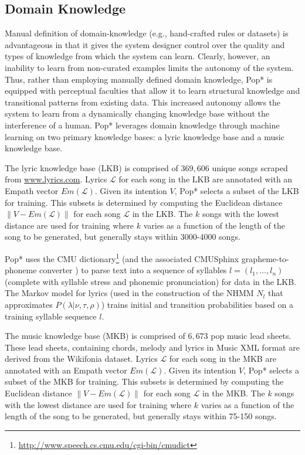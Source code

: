 \documentclass[phd,electronic,oneside,twosidetoc,letterpaper,chaptercenter,parttop,lof,lot]{byumsphd}
\begin{document}
\subsection{Domain Knowledge}

Manual definition of domain-knowledge (e.g., hand-crafted rules or datasets) is advantageous in that it gives the system designer control over the quality and types of knowledge from which the system can learn. Clearly, however, an inability to learn from non-curated examples limits the autonomy of the system. Thus, rather than employing manually defined domain knowledge, Pop* is equipped with perceptual faculties that allow it to learn structural knowledge and transitional patterns from existing data. This increased autonomy allows the system to learn from a dynamically changing knowledge base without the interference of a human. Pop* leverages domain knowledge through machine learning on two primary knowledge bases: a lyric knowledge base and a music knowledge base.

The lyric knowledge base (LKB) is comprised of $369,606$ unique songs scraped from \url{www.lyrics.com}. Lyrics $\mathcal{L}$ for each song in the LKB are annotated with an Empath vector $Em(\mathcal{L})$. Given its intention $V$, Pop* selects a subset of the LKB for training. This subsets is determined by computing the Euclidean distance $\lVert V - Em(\mathcal{L})\rVert$ for each song $\mathcal{L}$ in the LKB. The $k$ songs with the lowest distance are used for training where $k$ varies as a function of the length of the song to be generated, but generally stays within 3000-4000 songs.

Pop* uses the CMU dictionary\footnote{\url{http://www.speech.cs.cmu.edu/cgi-bin/cmudict}} (and the associated CMUSphinx grapheme-to-phoneme converter \citep{Walker2004}) to parse text into a sequence of syllables $l=(l_1,\dots,l_n)$ (complete with syllable stress and phonemic pronunciation) for data in the LKB. The Markov model for lyrics (used in the construction of the NHMM $N_l$ that approximates $P(\lambda|\nu,\tau,\rho)$) trains initial and transition probabilities based on a training syllable sequence $l$.

The music knowledge base (MKB) is comprised of $6,673$ pop music lead sheets. These lead sheets, containing chords, melody and lyrics in Music XML format are derived from the Wikifonia dataset. Lyrics $\mathcal{L}$ for each song in the MKB are annotated with an Empath vector $Em(\mathcal{L})$. Given its intention $V$, Pop* selects a subset of the MKB for training. This subsets is determined by computing the Euclidean distance $\lVert V - Em(\mathcal{L})\rVert$ for each song $\mathcal{L}$ in the MKB. The $k$ songs with the lowest distance are used for training where $k$ varies as a function of the length of the song to be generated, but generally stays within 75-150 songs.
\end{document}
